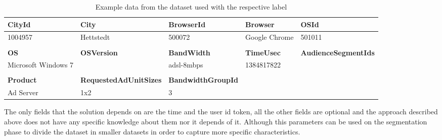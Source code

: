 \begin{table}[h]
\begin{tabular}{lllll}
\multicolumn{1}{l|}{\textbf{CityId}}                  & \multicolumn{1}{l|}{\textbf{City}}                        & \multicolumn{1}{l|}{\textbf{BrowserId}}        & \multicolumn{1}{l|}{\textbf{Browser}}  & \textbf{OSId}               \\ \hline
\multicolumn{1}{l|}{1004957}                          & \multicolumn{1}{l|}{Hettstedt}                            & \multicolumn{1}{l|}{500072}                    & \multicolumn{1}{l|}{Google Chrome}     & 501011                      \\
                                                      &                                                           &                                                &                                        &                             \\
\multicolumn{1}{l|}{\textbf{OS}}                      & \multicolumn{1}{l|}{\textbf{OSVersion}}                   & \multicolumn{1}{l|}{\textbf{BandWidth}}        & \multicolumn{1}{l|}{\textbf{TimeUsec}} & \textbf{AudienceSegmentIds} \\ \hline
\multicolumn{1}{l|}{Microsoft Windows 7}              & \multicolumn{1}{l|}{}                                     & \multicolumn{1}{l|}{adsl-8mbps}                & \multicolumn{1}{l|}{1384817822}        &                             \\
                                                      &                                                           &                                                &                                        &                             \\
\multicolumn{1}{l|}{\textbf{Product}}                 & \multicolumn{1}{l|}{\textbf{RequestedAdUnitSizes}}        & \multicolumn{1}{l|}{\textbf{BandwidthGroupId}} &                                        &                             \\ \cline{1-3}
\multicolumn{1}{l|}{Ad Server}                        & \multicolumn{1}{l|}{1x2}                                  & \multicolumn{1}{l|}{3}                         &                                        &                            
\end{tabular}
\caption{Example data from the dataset used with the respective label}\label{tab:dataset}
\end{table}

The only fields that the solution depends on are the time and the user id token,
all the other fields are optional and the approach described above does not have
any specific knowledge about them nor it depends of it. Although this parameters
can be used on the segmentation phase to divide the dataset in smaller datasets
in order to capture more specific characteristics.

